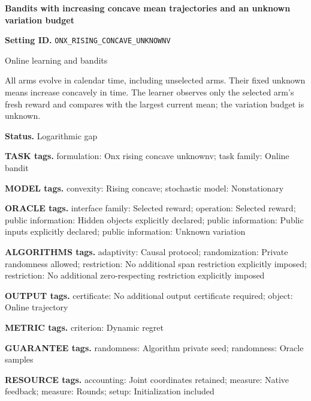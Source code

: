\documentclass[10pt,a4paper]{article}
\begin{document}
\raggedright

{\LARGE\bfseries\sffamily\color{AtlasNavy} Bandits with increasing concave mean trajectories and an unknown variation budget\par}\vspace{5pt}


\textbf{Setting ID.} \texttt{ONX\_\allowbreak{}RISING\_\allowbreak{}CONCAVE\_\allowbreak{}UNKNOWNV}



Online learning and bandits



All arms evolve in calendar time, including unselected arms. Their fixed unknown means increase concavely in time. The learner observes only the selected arm's fresh reward and compares with the largest current mean; the variation budget is unknown.



\textbf{Status.} Logarithmic gap



\textbf{TASK tags.} formulation: Onx rising concave unknownv; task family: Online bandit



\textbf{MODEL tags.} convexity: Rising concave; stochastic model: Nonstationary



\textbf{ORACLE tags.} interface family: Selected reward; operation: Selected reward; public information: Hidden objects explicitly declared; public information: Public inputs explicitly declared; public information: Unknown variation



\textbf{ALGORITHMS tags.} adaptivity: Causal protocol; randomization: Private randomness allowed; restriction: No additional span restriction explicitly imposed; restriction: No additional zero-respecting restriction explicitly imposed



\textbf{OUTPUT tags.} certificate: No additional output certificate required; object: Online trajectory



\textbf{METRIC tags.} criterion: Dynamic regret



\textbf{GUARANTEE tags.} randomness: Algorithm private seed; randomness: Oracle samples



\textbf{RESOURCE tags.} accounting: Joint coordinates retained; measure: Native feedback; measure: Rounds; setup: Initialization included
\end{document}
